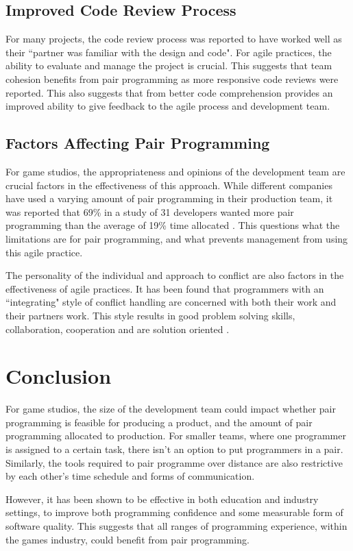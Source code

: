 \documentclass{scrartcl}
\begin{document}
\subsection{Improved Code Review Process}
For many projects, the code review process was reported to have worked well as their ``partner was familiar with the design and code"\cite{Vanhanen:2007}. For agile practices, the ability to evaluate and manage the project is crucial. This suggests that team cohesion benefits from pair programming as more responsive code reviews were reported. This also suggests that from better code comprehension provides an improved ability to give feedback to the agile process and development team.

\subsection{Factors Affecting Pair Programming}
For game studios, the appropriateness and opinions of the development team are crucial factors in the effectiveness of this approach. While different companies have used a varying amount of pair programming in their production team, it was reported that 69\% in a study of 31 developers wanted more pair programming than the average of 19\% time allocated \cite{Plonka:2012}. This questions what the limitations are for pair programming, and what prevents management from using this agile practice.

The personality of the individual and approach to conflict are also factors in the effectiveness of agile practices. It has been found that programmers with an ``integrating" style of conflict handling are concerned with both their work and their partners work. This style results in good problem solving skills, collaboration, cooperation and are solution oriented \cite{Domino:2003}.

\section*{Conclusion}
For game studios, the size of the development team could impact whether pair programming is feasible for producing a product, and the amount of pair programming allocated to production. For smaller teams, where one programmer is assigned to a certain task, there isn't an option to put programmers in a pair. Similarly, the tools required to pair programme over distance are also restrictive by each other's time schedule and forms of communication.

However, it has been shown to be effective in both education and industry settings, to improve both programming confidence and some measurable form of software quality. This suggests that all ranges of programming experience, within the games industry, could benefit from pair programming.
\end{document}
